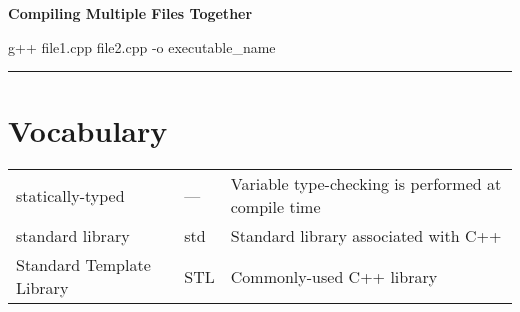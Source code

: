 \documentclass[10pt]{article}
\begin{document}
\begin{centering}
\color{blue}\textbf{Compiling Multiple Files Together}\color{black}
\end{centering}
\begin{flushleft}\justify
\color{red}g++ file1.cpp file2.cpp -o executable\_name\color{black}
\newline
\noindent\rule{16.5cm}{0.4pt}
\end{flushleft}


\section{Vocabulary}

\begin{tabular}{l l l}
statically-typed & --- & Variable type-checking is performed at compile time\\
standard library & std & Standard library associated with C++\\
Standard Template Library & STL & Commonly-used C++ library\\
\end{tabular}
\end{document}
